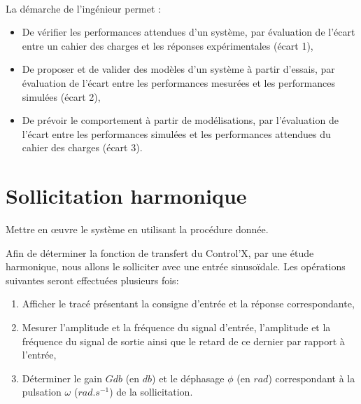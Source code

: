 

 \\

\graphicspath{{../../../img/}}
\begin{center}
\def\svgwidth{\columnwidth}

\end{center}

La démarche de l’ingénieur permet :
\begin{itemize}
 \item De vérifier les performances attendues d’un système, par évaluation de l’écart entre un cahier des charges et les réponses expérimentales (écart 1),
 \item De proposer et de valider des modèles d’un système à partir d’essais, par évaluation de l’écart entre les performances mesurées et les performances simulées (écart 2),
 \item De prévoir le comportement à partir de modélisations, par l’évaluation de l’écart entre les performances simulées et les performances attendues du cahier des charges (écart 3).
\end{itemize}



\newpage

\section{Sollicitation harmonique}

Mettre en \oe uvre le système en utilisant la procédure donnée.

Afin de déterminer la fonction de transfert du Control'X, par une étude harmonique, nous allons le solliciter avec une entrée sinusoïdale. Les opérations suivantes seront effectuées plusieurs fois:
\begin{enumerate}
 \item Afficher le tracé présentant la consigne d'entrée et la réponse correspondante,
 \item Mesurer l'amplitude et la fréquence du signal d'entrée, l'amplitude et la fréquence du signal de sortie ainsi que le retard de ce dernier par rapport à l'entrée,
 \item Déterminer le gain $Gdb$ (en $db$) et le déphasage $\phi$ (en $rad$) correspondant à la pulsation $\omega$ ($rad.s^{-1}$) de la sollicitation.
\end{enumerate}


